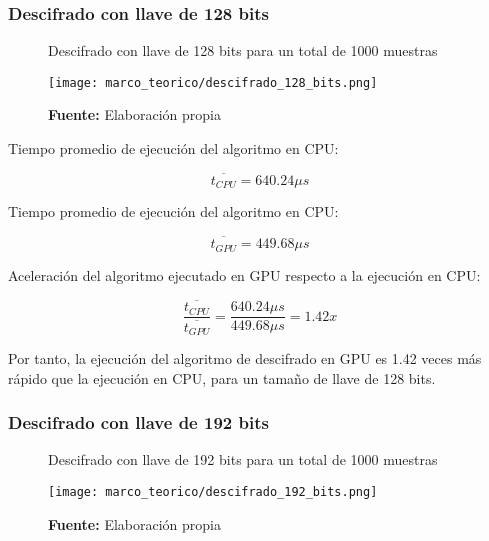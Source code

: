 \documentclass[../main/main.tex]{subfiles}
\begin{document}
      \subsubsection{Descifrado con llave de 128 bits}

        \begin{figure}[H]
          \centering
          \caption{Descifrado con llave de 128 bits para un total de 1000 muestras}
          \texttt{[image: marco\_teorico/descifrado\_128\_bits.png]}
          \caption*{\textbf{Fuente:} Elaboración propia}
        \end{figure}

        Tiempo promedio de ejecución del algoritmo en CPU:

        \vspace{-0.7cm}\begin{equation}
          \overline{t_{CPU}} = 640.24\mu s
        \end{equation}

        Tiempo promedio de ejecución del algoritmo en CPU:

        \vspace{-0.7cm}\begin{equation}
          \overline{t_{GPU}} = 449.68\mu s
        \end{equation}

        Aceleración del algoritmo ejecutado en GPU respecto a la ejecución en CPU:

        \vspace{-0.7cm}\begin{equation}
          \frac{\overline{t_{CPU}}}{\overline{t_{GPU}}} = \frac{640.24\mu s}{449.68\mu s} = 1.42x
        \end{equation}

        Por tanto, la ejecución del algoritmo de descifrado en GPU es 1.42 veces más rápido que la ejecución en CPU, para un tamaño de llave de 128 bits.

      \subsubsection{Descifrado con llave de 192 bits}

        \begin{figure}[H]
          \centering
          \caption{Descifrado con llave de 192 bits para un total de 1000 muestras}
          \texttt{[image: marco\_teorico/descifrado\_192\_bits.png]}
          \caption*{\textbf{Fuente:} Elaboración propia}
        \end{figure}
\end{document}
